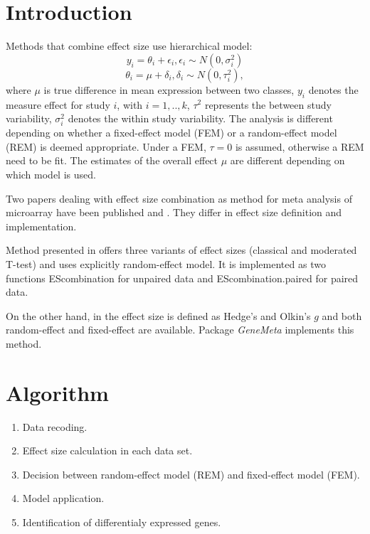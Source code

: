 \documentclass[a4paper]{report}
\begin{document}
\section*{Introduction}
Methods that combine effect size use hierarchical model:
\[ y_i=\theta_i+\epsilon_i, \epsilon_i \sim N(0,\sigma_i^2)\]
\[ \theta_i=\mu+\delta_i, \delta_i \sim N(0,\tau_i^2),\]
where $\mu$ is true difference in mean expression between two classes, $y_i$ denotes the measure effect for study $i$, with $i=1,..,k$, $\tau^2$ represents the between study variability, $\sigma_i^2$ denotes the within study variability. The analysis is different depending on whether a fixed-effect model (FEM) or a random-effect model (REM) is deemed appropriate. Under a FEM, $\tau=0$ is assumed, otherwise a REM need to be fit. The estimates of the overall effect $\mu$ are different depending on which model is used. \par
Two papers dealing with effect size combination as method for meta analysis of microarray have been published \cite{Marot} and \cite{Choi2003}. They differ in effect size definition and implementation.\par 
Method presented in \cite{Marot} offers three variants of effect sizes (classical and moderated T-test) and uses explicitly random-effect model. It is implemented as two functions {\ttfamily EScombination} for unpaired data and {\ttfamily EScombination.paired} for paired data.  
\par On the other hand, in \cite{Choi2003} the effect size is defined as Hedge's and Olkin's $g$ and both random-effect and fixed-effect are available. Package \emph{GeneMeta} \cite{GeneMeta} implements this method. 
\section*{Algorithm}
\begin{enumerate}
\item Data recoding.
\item Effect size calculation in each data set.
\item Decision between random-effect model (REM) and fixed-effect model (FEM).
\item Model application.
\item Identification of differentialy expressed genes.
\end{enumerate}
\end{document}
